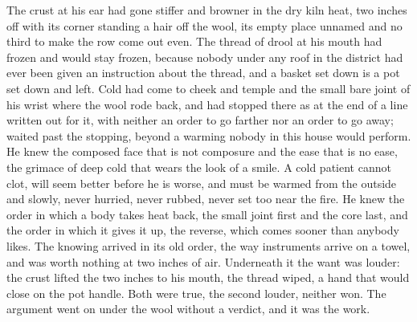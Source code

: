 The crust at his ear had gone stiffer and browner in the dry kiln heat, two inches off with its corner standing a hair off the wool, its empty place unnamed and no third to make the row come out even. The thread of drool at his mouth had frozen and would stay frozen, because nobody under any roof in the district had ever been given an instruction about the thread, and a basket set down is a pot set down and left. Cold had come to cheek and temple and the small bare joint of his wrist where the wool rode back, and had stopped there as at the end of a line written out for it, with neither an order to go farther nor an order to go away;  waited past the stopping, beyond a warming nobody in this house would perform. He knew the composed face that is not composure and the ease that is no ease, the grimace of deep cold that wears the look of a smile. A cold patient cannot clot, will seem better before he is worse, and must be warmed from the outside and slowly, never hurried, never rubbed, never set too near the fire. He knew the order in which a body takes heat back, the small joint first and the core last, and the order in which it gives it up, the reverse, which comes sooner than anybody likes. The knowing arrived in its old order, the way instruments arrive on a towel, and was worth nothing at two inches of air. Underneath it the want was louder: the crust lifted the two inches to his mouth, the thread wiped, a hand that would close on the pot handle. Both were true, the second louder, neither won. The argument went on under the wool without a verdict, and it was the work.

\scenebreak

